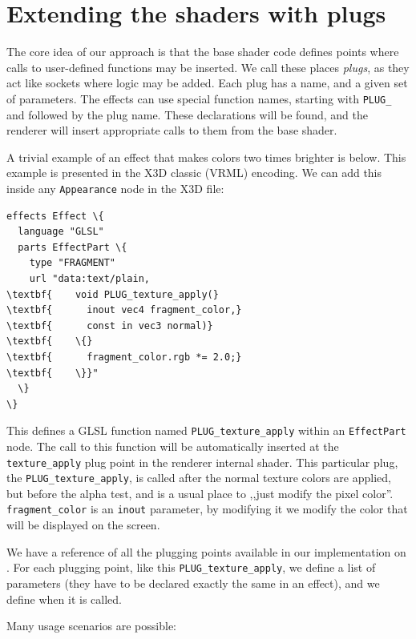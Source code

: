 \documentclass{egpubl}
\begin{document}
\section{Extending the shaders with plugs}

The core idea of our approach is that the base shader code defines
points where calls to user-defined functions may be inserted. We call
these places \textit{plugs}, as they act like sockets where logic
may be added. Each plug has a name, and a given set of parameters.
The effects can use special function names, starting with \texttt{PLUG\_}
and followed by the plug name. These declarations will be found,
and the renderer will insert appropriate calls to them from the base shader.

A trivial example of an effect that makes colors two times brighter
is below. This example is presented in the X3D classic (VRML) encoding.
We can add this inside any \texttt{Appearance} node in the X3D file:

\begin{Verbatim}[commandchars=\\\{\},frame=single,fontsize=\small]
effects Effect \{
  language "GLSL"
  parts EffectPart \{
    type "FRAGMENT"
    url "data:text/plain,
\textbf{    void PLUG_texture_apply(}
\textbf{      inout vec4 fragment_color,}
\textbf{      const in vec3 normal)}
\textbf{    \{}
\textbf{      fragment_color.rgb *= 2.0;}
\textbf{    \}}"
  \}
\}
\end{Verbatim}

This defines a GLSL function named \texttt{PLUG\_texture\_apply}
within an \texttt{EffectPart} node. The call to this function will
be automatically inserted at the \texttt{texture\_apply} plug point in
the renderer internal shader. This particular plug,
the \texttt{PLUG\_texture\_apply}, is called after the normal texture colors
are applied, but before the alpha test, and is a usual place to ,,just modify the pixel color''.
\texttt{fragment\_color} is an \texttt{inout} parameter, by modifying it
we modify the color that will be displayed on the screen.

We have a reference of all the plugging points available in our implementation
on .
For each plugging point,
like this \texttt{PLUG\_texture\_apply}, we define a list of parameters
(they have to be declared exactly the same in an effect), and we define
when it is called.

\needspace{1in}
Many usage scenarios are possible:
\end{document}
